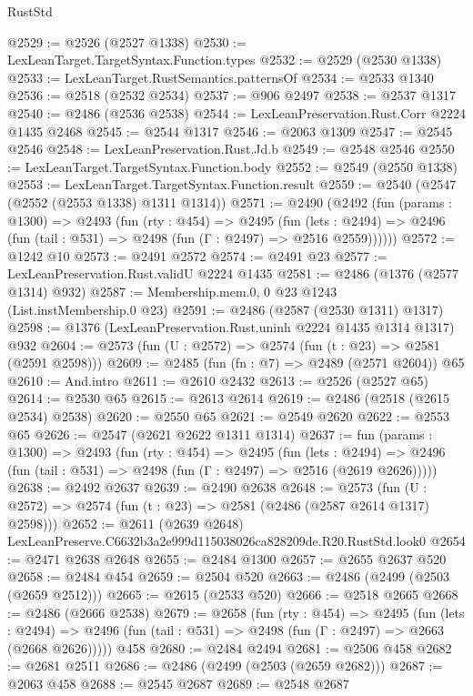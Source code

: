 \begin{lexlean}{RustStd}
\begin{coremodule}
@2529 := @2526 (@2527 @1338)
@2530 := LexLeanTarget.TargetSyntax.Function.types
@2532 := @2529 (@2530 @1338)
@2533 := LexLeanTarget.RustSemantics.patternsOf
@2534 := @2533 @1340
@2536 := @2518 (@2532 @2534)
@2537 := @906 @2497
@2538 := @2537 @1317
@2540 := @2486 (@2536 @2538)
@2544 := LexLeanPreservation.Rust.Corr @2224 @1435 @2468
@2545 := @2544 @1317
@2546 := @2063 @1309
@2547 := @2545 @2546
@2548 := LexLeanPreservation.Rust.Jd.b
@2549 := @2548 @2546
@2550 := LexLeanTarget.TargetSyntax.Function.body
@2552 := @2549 (@2550 @1338)
@2553 := LexLeanTarget.TargetSyntax.Function.result
@2559 := @2540 (@2547 (@2552 (@2553 @1338) @1311 @1314))
@2571 := @2490
    (@2492
      (fun (params : @1300) =>
      @2493
        (fun (rty : @454) =>
        @2495
          (fun (lets : @2494) =>
          @2496 (fun (tail : @531) => @2498 (fun (Γ : @2497) => @2516 @2559))))))
@2572 := @1242 @10
@2573 := @2491 @2572
@2574 := @2491 @23
@2577 := LexLeanPreservation.Rust.validU @2224 @1435
@2581 := @2486 (@1376 (@2577 @1314) @932)
@2587 := Membership.mem.{0, 0} @23 @1243 (List.instMembership.{0} @23)
@2591 := @2486 (@2587 (@2530 @1311) @1317)
@2598 := @1376 (LexLeanPreservation.Rust.uninh @2224 @1435 @1314 @1317) @932
@2604 := @2573 (fun (U : @2572) => @2574 (fun (t : @23) => @2581 (@2591 @2598)))
@2609 := @2485 (fun (fn : @7) => @2489 (@2571 @2604)) @65
@2610 := And.intro
@2611 := @2610 @2432
@2613 := @2526 (@2527 @65)
@2614 := @2530 @65
@2615 := @2613 @2614
@2619 := @2486 (@2518 (@2615 @2534) @2538)
@2620 := @2550 @65
@2621 := @2549 @2620
@2622 := @2553 @65
@2626 := @2547 (@2621 @2622 @1311 @1314)
@2637 := fun (params : @1300) =>
  @2493
    (fun (rty : @454) =>
    @2495
      (fun (lets : @2494) =>
      @2496 (fun (tail : @531) => @2498 (fun (Γ : @2497) => @2516 (@2619 @2626)))))
@2638 := @2492 @2637
@2639 := @2490 @2638
@2648 := @2573 (fun (U : @2572) => @2574 (fun (t : @23) => @2581 (@2486 (@2587 @2614 @1317) @2598)))
@2652 := @2611 (@2639 @2648) LexLeanPreserve.C6632b3a2e999d115038026ca828209de.R20.RustStd.look0
@2654 := @2471 @2638 @2648
@2655 := @2484 @1300
@2657 := @2655 @2637 @520
@2658 := @2484 @454
@2659 := @2504 @520
@2663 := @2486 (@2499 (@2503 (@2659 @2512)))
@2665 := @2615 (@2533 @520)
@2666 := @2518 @2665
@2668 := @2486 (@2666 @2538)
@2679 := @2658
    (fun (rty : @454) =>
    @2495
      (fun (lets : @2494) =>
      @2496 (fun (tail : @531) => @2498 (fun (Γ : @2497) => @2663 (@2668 @2626)))))
    @458
@2680 := @2484 @2494
@2681 := @2506 @458
@2682 := @2681 @2511
@2686 := @2486 (@2499 (@2503 (@2659 @2682)))
@2687 := @2063 @458
@2688 := @2545 @2687
@2689 := @2548 @2687

\end{coremodule}
\end{lexlean}
